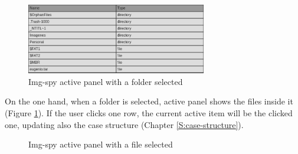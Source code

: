 \begin{figure}[htb]
	\begin{center}
		\includegraphics[width=0.7\textwidth]
		{./figures/explorer-active-folder.png}
		\caption{Img-spy active panel with a folder selected}
		\label{F:img-spy-active-folder}
	\end{center}
\end{figure}

On the one hand, when a folder is selected, active panel shows the files inside
it (Figure \ref{F:img-spy-active-folder}). If the user clicks one row, the
current active item will be the clicked one, updating also the case structure
(Chapter \ref{S:case-structure}).

\patchcmd{\subfigmatrix}{\hfill}{\hspace{0.2cm}}{}{}
\begin{figure}[htb]
	\begin{center}
		\begin{subfigmatrix}{2}
		\end{subfigmatrix}
		\caption{Img-spy active panel with a file selected}
		\label{F:img-spy-active-file}
	\end{center}
\end{figure}

